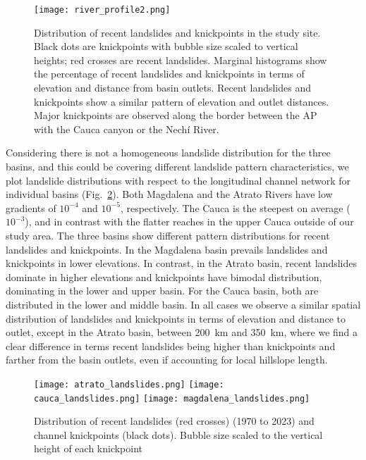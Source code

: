\documentclass[draft]{agujournal2019}
\begin{document}
\begin{figure}[ht!]
     \centering
        {\texttt{[image: river\_profile2.png]}}
    \caption{Distribution of recent landslides and knickpoints in the study site. Black dots are knickpoints with bubble size scaled to vertical heights; red crosses are recent landslides. Marginal histograms show the percentage of recent landslides and knickpoints in terms of elevation and distance from basin outlets. Recent landslides and knickpoints show a similar pattern of elevation and outlet distances. Major knickpoints are observed along the border between the AP with the Cauca canyon or the Nechí River.}
  \label{fig:profiles}
\end{figure}

\par Considering there is not a homogeneous landslide distribution for the three basins, and this could be covering different landslide pattern characteristics, we plot landslide distributions with respect to the longitudinal channel network for individual basins (Fig.~\ref{fig:elevationKnickpoints}). Both Magdalena and the Atrato Rivers have low gradients of $10^{-4}$ and $10^{-5}$, respectively. The Cauca is the steepest on average ($10^{-3}$), and in contrast with the flatter reaches in the upper Cauca outside of our study area. The three basins show different pattern distributions for recent landslides and knickpoints. In the Magdalena basin prevails landslides and knickpoints in lower elevations. In contrast, in the Atrato basin, recent landslides dominate in higher elevations and knickpoints have bimodal distribution, dominating in the lower and upper basin. For the Cauca basin, both are distributed in the lower and middle basin. In all cases we observe a similar spatial distribution of landslides and knickpoints in terms of elevation and distance to outlet, except in the Atrato basin, between 200~km and 350~km, where we find a clear difference in terms recent landslides being higher than knickpoints and farther from the basin outlets, even if accounting for local hillslope length. 

\begin{figure}[ht!]
    \centering
      {\texttt{[image: atrato\_landslides.png]}}
      {\texttt{[image: cauca\_landslides.png]}}
      {\texttt{[image: magdalena\_landslides.png]}}
    \caption{Distribution of recent landslides (red crosses) (1970 to 2023) and channel knickpoints (black dots). Bubble size scaled to the vertical height of each knickpoint}
    \label{fig:elevationKnickpoints}
\end{figure}
\end{document}
